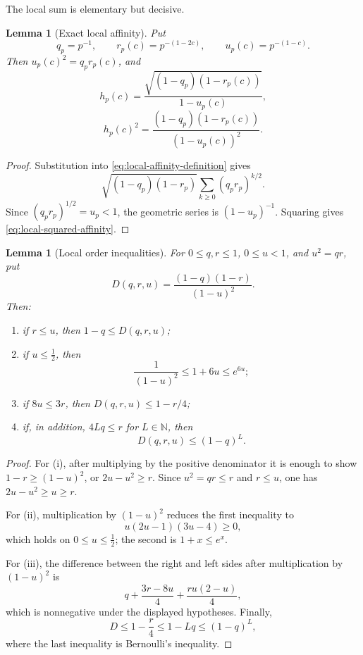 \documentclass[11pt]{article}
\newtheorem{lemma}[theorem]{Lemma}
\theoremstyle{definition}
\theoremstyle{remark}
\newcommand{\N}{\mathbb N}
\begin{document}
The local sum is elementary but decisive.

\begin{lemma}[Exact local affinity]\label{lem:local-affinity}
Put
\[
 q_p=p^{-1},\qquad
 r_p(c)=p^{-(1-2c)},\qquad
 u_p(c)=p^{-(1-c)}.
 \tag{2.7}\label{eq:qru}
\]
Then \(u_p(c)^2=q_pr_p(c)\), and
\[
 h_p(c)=
 \frac{\sqrt{(1-q_p)(1-r_p(c))}}{1-u_p(c)},
 \tag{2.8}\label{eq:local-affinity}
\]
\[
 h_p(c)^2=
 \frac{(1-q_p)(1-r_p(c))}{(1-u_p(c))^2}.
 \tag{2.9}\label{eq:local-squared-affinity}
\]
\end{lemma}

\begin{proof}
Substitution into \eqref{eq:local-affinity-definition} gives
\[
 \sqrt{(1-q_p)(1-r_p)}
 \sum_{k\geq0}(q_pr_p)^{k/2}.
\]
Since \((q_pr_p)^{1/2}=u_p<1\), the geometric series is
\((1-u_p)^{-1}\).  Squaring gives \eqref{eq:local-squared-affinity}.
\end{proof}

\begin{lemma}[Local order inequalities]\label{lem:local-order}
For \(0\leq q,r\leq1\), \(0\leq u<1\), and \(u^2=qr\), put
\[
 D(q,r,u)=\frac{(1-q)(1-r)}{(1-u)^2}.
\]
Then:
\begin{enumerate}[label=\textup{(\roman*)}]
\item if \(r\leq u\), then \(1-q\leq D(q,r,u)\);
\item if \(u\leq\tfrac12\), then
\[
 \frac1{(1-u)^2}\leq1+6u\leq e^{6u};
 \tag{2.10}\label{eq:exp-local-bound}
\]
\item if \(8u\leq3r\), then \(D(q,r,u)\leq1-r/4\);
\item if, in addition, \(4Lq\leq r\) for \(L\in\N\), then
\[
 D(q,r,u)\leq(1-q)^L.
 \tag{2.11}\label{eq:wold-power-local}
\]
\end{enumerate}
\end{lemma}

\begin{proof}
For (i), after multiplying by the positive denominator it is enough to show
\(1-r\geq(1-u)^2\), or \(2u-u^2\geq r\).  Since \(u^2=qr\leq r\) and
\(r\leq u\), one has \(2u-u^2\geq u\geq r\).

For (ii), multiplication by \((1-u)^2\) reduces the first inequality to
\[
 u(2u-1)(3u-4)\geq0,
\]
which holds on \(0\leq u\leq\tfrac12\); the second is \(1+x\leq e^x\).

For (iii), the difference between the right and left sides after multiplication by
\((1-u)^2\) is
\[
 q+\frac{3r-8u}{4}+\frac{ru(2-u)}4,
\]
which is nonnegative under the displayed hypotheses.  Finally,
\[
 D\leq1-\frac r4\leq1-Lq\leq(1-q)^L,
\]
where the last inequality is Bernoulli's inequality.
\end{proof}
\end{document}
